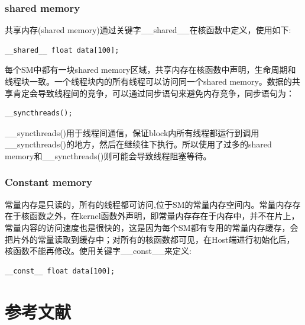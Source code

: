 \documentclass[12pt]{book}
\begin{document}
\subsection{shared memory}
共享内存(shared memory)通过关键字\_\_shared\_\_在核函数中定义，使用如下:
\begin{lstlisting}
__shared__ float data[100];
\end{lstlisting}
每个SM中都有一块shared memory区域，共享内存在核函数中声明，生命周期和线程块一致。一个线程块内的所有线程可以访问同一个shared memory。数据的共享肯定会导致线程间的竞争，可以通过同步语句来避免内存竞争，同步语句为：
\begin{lstlisting}
__syncthreads();
\end{lstlisting}
\_\_syncthreads()用于线程间通信，保证block内所有线程都运行到调用\_\_syncthreads()的地方，然后在继续往下执行。所以使用了过多的shared memory和\_\_syncthreads()则可能会导致线程阻塞等待。

\subsection{Constant memory}
常量内存是只读的，所有的线程都可访问,位于SM的常量内存空间内。常量内存存在于核函数之外，在kernel函数外声明，即常量内存存在于内存中，并不在片上，常量内容的访问速度也是很快的，这是因为每个SM都有专用的常量内存缓存，会把片外的常量读取到缓存中；对所有的核函数都可见，在Host端进行初始化后，核函数不能再修改。使用关键字\_\_const\_\_来定义:
\begin{lstlisting}
__const__ float data[100];
\end{lstlisting}
\newpage
 
\fancyhead{}
 

 
\chapter{参考文献}


 
\end{document}
